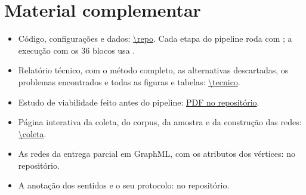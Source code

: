 \section*{Material complementar}

\begin{itemize}
    \item Código, configurações e dados: \url{\repo}. Cada etapa do pipeline roda com
    ; a execução com os 36
    blocos usa .
    \item Relatório técnico, com o método completo, as alternativas descartadas, os problemas
    encontrados e todas as figuras e tabelas: \url{\tecnico}.
    \item Estudo de viabilidade feito antes do pipeline: \href{\viabilidade}{PDF no
    repositório}.
    \item Página interativa da coleta, do corpus, da amostra e da construção das redes:
    \url{\coleta}.
    \item As redes da entrega parcial em GraphML, com os atributos dos vértices:
     no repositório.
    \item A anotação dos sentidos e o seu protocolo:  no repositório.
\end{itemize}
